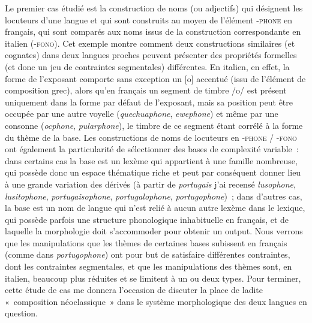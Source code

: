 \documentclass[output=paper]{langsci/langscibook}
\begin{document}
Le premier cas étudié est la construction de noms (ou adjectifs) qui
désignent les locuteurs d'une langue et qui sont construits au moyen de
l'élément \textsc{-phone} en français, qui sont comparés aux noms issus
de la construction correspondante en italien (-\textsc{fono}). Cet
exemple montre comment deux constructions similaires (et cognates) dans
deux langues proches peuvent présenter des propriétés formelles (et donc
un jeu de contraintes segmentales) différentes. En italien, en effet, la
forme de l'exposant comporte sans exception un {[}o{]} accentué (issu de
l'élément de composition grec), alors qu'en français un segment de
timbre /o/ est présent uniquement dans la forme par défaut de
l'exposant, mais sa position peut être occupée par une autre voyelle
(\emph{quechuaphone}, \emph{ewephone}) et même par une consonne
(\emph{ocphone}, \emph{pularphone}), le timbre de ce segment étant
corrélé à la forme du thème de la base. Les constructions de noms de
locuteurs en -\textsc{phone / -fono} ont également la particularité de
sélectionner des bases de complexité variable~: dans certains cas la
base est un lexème qui appartient à une famille nombreuse, qui possède
donc un espace thématique riche et peut par conséquent donner lieu à une
grande variation des dérivés (à partir de \emph{portugais} j'ai recensé
\emph{lusophone}, \emph{lusitophone}, \emph{portugaisophone},
\emph{portugalophone}, \emph{portugophone})~; dans d'autres cas, la base
est un nom de langue qui n'est relié à aucun autre lexème dans le
lexique, qui possède parfois une structure phonologique inhabituelle en
français, et de laquelle la morphologie doit s'accommoder pour obtenir un
output. Nous verrons que les manipulations que les thèmes de certaines
bases subissent en français (comme dans \emph{portugophone}) ont pour
but de satisfaire différentes contraintes, dont les contraintes
segmentales, et que les manipulations des thèmes sont, en italien,
beaucoup plus réduites et se limitent à un ou deux types. Pour terminer,
cette étude de cas me donnera l'occasion de discuter la place de ladite
«~composition néoclassique~» dans le système morphologique des deux
langues en question.
\end{document}
